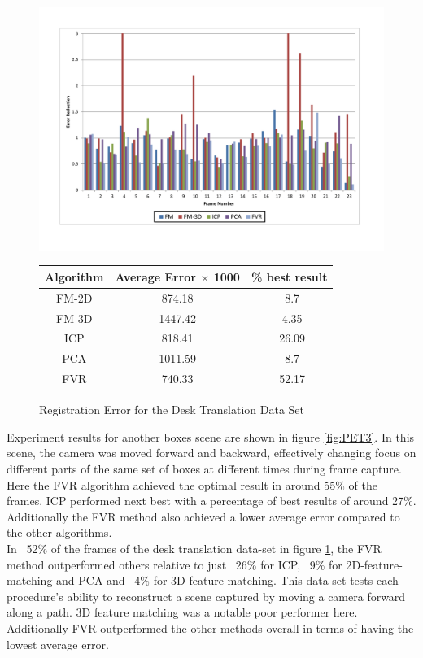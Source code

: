 \begin{figure}
\centering
\includegraphics[width=6in]{images/results/Desk_Texture_Translation}
\caption{Registration Error for the Desk Translation Data Set}
\label{fig:PET4}

\begin{tabular}{ccc}
\hline
\textbf{Algorithm} & \textbf{Average Error $\times$ 1000} & \textbf{\% best result}\\ \hline
FM-2D	& 874.18 & ~8.7\\
FM-3D	& 1447.42 & ~4.35\\
ICP		& 818.41 & ~26.09\\
PCA		& 1011.59 & ~8.7\\
FVR		& 740.33 & ~52.17\\
\end{tabular}
\end{figure} 


Experiment results for another boxes scene are shown in figure \ref{fig:PET3}. In this scene, the camera was moved forward and backward, effectively changing focus on different parts of the same set of boxes at different times during frame capture. Here the FVR algorithm achieved the optimal result in around 55\% of the frames. ICP performed next best with a percentage of best results of around 27\%. Additionally the FVR method also achieved a lower average error compared to the other algorithms. \\


In ~52\% of the frames of the desk translation data-set in figure \ref{fig:PET4}, the FVR method outperformed others relative to just ~26\% for ICP, ~9\% for 2D-feature-matching and PCA and ~4\% for 3D-feature-matching. This data-set tests each procedure's ability to reconstruct a scene captured by moving a camera forward along a path. 3D feature matching was a notable poor performer here. Additionally FVR outperformed the other methods overall in terms of having the lowest average error. \\

